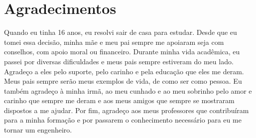\dedication{Dedico este trabalho aos meus pais}

\chapter*{Agradecimentos}

Quando eu tinha 16 anos, eu resolvi sair de casa para estudar. Desde que eu tomei essa
decisão, minha mãe e meu pai sempre me apoiaram seja com conselhos, com apoio moral ou financeiro.  
Durante minha vida acadêmica, eu passei
por diversas dificuldades e meus pais sempre estiveram do meu lado. Agradeço a eles pelo suporte, pelo 
carinho e pela educação que eles me deram. Meus pais sempre serão meus exemplos de vida, de como 
ser como pessoa.
Eu também agradeço à minha irmã, ao meu cunhado e ao meu sobrinho pelo amor e carinho 
que sempre me deram e aos meus amigos que sempre se mostraram dispostos a me ajudar.
Por fim, agradeço aos meus professores que contribuíram para a minha formação e por passarem
o conhecimento necessário para eu me tornar um engenheiro.